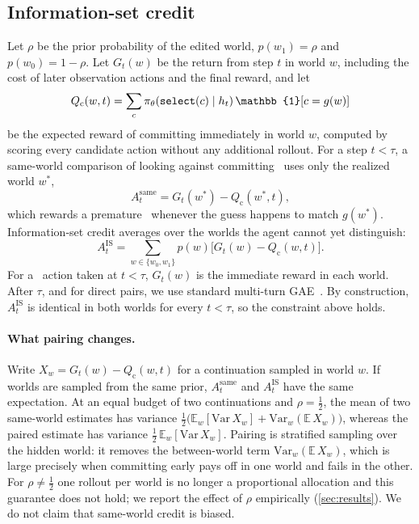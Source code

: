 \subsection{Information-set credit}
Let $\rho$ be the prior probability of the edited world, $p(w_1) = \rho$ and $p(w_0) = 1 - \rho$.
Let $G_t(w)$ be the return from step $t$ in world $w$, including the cost of later observation actions and the final reward, and let
\begin{equation}
Q_{\mathrm{c}}(w, t) = \sum_{c} \pi_\theta(\commit(c) \mid h_t)\, \mathbb{1}[c = g(w)]
\end{equation}
be the expected reward of committing immediately in world $w$, computed by scoring every candidate action without any additional rollout.
For a step $t < \tau$, a same-world comparison of looking against committing~\cite{seekvln2026} uses only the realized world $w^\ast$,
\begin{equation}
A^{\mathrm{same}}_t = G_t(w^\ast) - Q_{\mathrm{c}}(w^\ast, t),
\end{equation}
which rewards a premature \commit\ whenever the guess happens to match $g(w^\ast)$.
Information-set credit averages over the worlds the agent cannot yet distinguish:
\begin{equation}
A^{\mathrm{IS}}_t = \sum_{w \in \{w_0, w_1\}} p(w) \big[ G_t(w) - Q_{\mathrm{c}}(w, t) \big].
\label{eq:is}
\end{equation}
For a \commit\ action taken at $t < \tau$, $G_t(w)$ is the immediate reward in each world.
After $\tau$, and for direct pairs, we use standard multi-turn GAE~\cite{gae2016,vagen2025}.
By construction, $A^{\mathrm{IS}}_t$ is identical in both worlds for every $t < \tau$, so the constraint above holds.

\paragraph{What pairing changes.}
Write $X_w = G_t(w) - Q_{\mathrm{c}}(w, t)$ for a continuation sampled in world $w$.
If worlds are sampled from the same prior, $A^{\mathrm{same}}_t$ and $A^{\mathrm{IS}}_t$ have the same expectation.
At an equal budget of two continuations and $\rho = \tfrac12$, the mean of two same-world estimates has variance $\tfrac12\big(\mathbb{E}_w[\mathrm{Var}\,X_w] + \mathrm{Var}_w(\mathbb{E}\,X_w)\big)$, whereas the paired estimate has variance $\tfrac12\,\mathbb{E}_w[\mathrm{Var}\,X_w]$.
Pairing is stratified sampling over the hidden world: it removes the between-world term $\mathrm{Var}_w(\mathbb{E}\,X_w)$, which is large precisely when committing early pays off in one world and fails in the other.
For $\rho \neq \tfrac12$ one rollout per world is no longer a proportional allocation and this guarantee does not hold; we report the effect of $\rho$ empirically (\cref{sec:results}).
We do not claim that same-world credit is biased.

